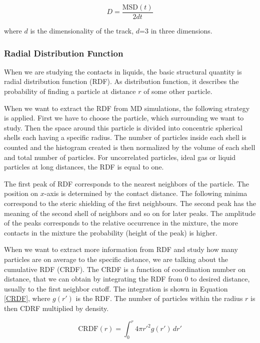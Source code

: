 \begin{equation}\label{eq:Di}
	D = \frac{\text{MSD}(t)}{2dt}
\end{equation}

where $d$ is the dimensionality of the track, $d$=3 in three dimensions.

\subsubsection{Radial Distribution Function}
When we are studying the contacts in liquids, the basic structural quantity is radial distribution function (RDF). As distribution function, it describes the probability of finding a particle at distance $r$ of some other particle. \cite{mdskripta} 

When we want to extract the RDF from MD simulations, the following strategy is applied. First we have to choose the particle, which surrounding we want to study. Then the space around this particle is divided into concentric spherical shells each having a specific radius. The number of particles inside each shell is counted and the histogram created is then normalized by the volume of each shell and total number of particles. For uncorrelated particles, ideal gas or liquid particles at long distances, the RDF is equal to one. 

The first peak of RDF corresponds to the nearest neighbors of the particle. The position on $x$-axis is determined by the contact distance. The following minima correspond to the steric shielding of the first neighbours. The second peak has the meaning of the second shell of neighbors and so on for later peaks. The amplitude of the peaks corresponds to the relative occurrence in the mixture, the more contacts in the mixture the probability (height of the peak) is higher.

When we want to extract more information from RDF and study how many particles are on average to the specific distance, we are talking about the cumulative RDF (CRDF). The CRDF is a function of coordination number on distance, that we can obtain by integrating the RDF from 0 to desired distance, usually to the first neighbor cutoff. The integration is shown in Equation \ref{CRDF}, where $g(r')$ is the RDF. The number of particles within the radius $r$ is then CDRF multiplied by density.

\begin{equation}\label{eq:CRDF}
	\text{CRDF}(r) = \int_{0}^{r} 4\pi r'^2 g(r') \, dr'
\end{equation}

